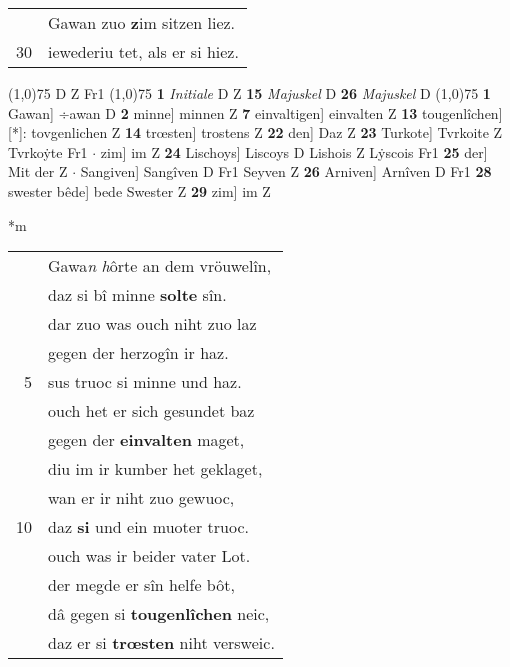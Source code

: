 \documentclass[8pt,a4paper,notitlepage]{article}
\begin{document}
\begin{table}[ht]
\begin{minipage}[t]{0.5\linewidth}
\begin{tabular}{rl}
 & Gawan zuo \textbf{z}im sitzen liez.\\ 
30 & iewederiu tet, als er si hiez.\\ 
\end{tabular}
\scriptsize
\line(1,0){75} \newline
D Z Fr1 \newline
\line(1,0){75} \newline
\textbf{1} \textit{Initiale} D Z  \textbf{15} \textit{Majuskel} D  \textbf{26} \textit{Majuskel} D  \newline
\line(1,0){75} \newline
\textbf{1} Gawan] ÷awan D \textbf{2} minne] minnen Z \textbf{7} einvaltigen] einvalten Z \textbf{13} tougenlîchen] [*]: tovgenlichen Z \textbf{14} trœsten] trostens Z \textbf{22} den] Daz Z \textbf{23} Turkote] Tvrkoite Z Tvrkoẏte Fr1  $\cdot$ zim] im Z \textbf{24} Lischoys] Liscoys D Lishois Z Lẏscois Fr1 \textbf{25} der] Mit der Z  $\cdot$ Sangiven] Sangîven D Fr1 Seyven Z \textbf{26} Arniven] Arnîven D Fr1 \textbf{28} swester bêde] bede Swester Z \textbf{29} zim] im Z \newline
\end{minipage}
\hspace{0.5cm}
\begin{minipage}[t]{0.5\linewidth}
\small
\begin{center}*m
\end{center}
\begin{tabular}{rl}
 & Gawa\textit{n} \textit{h}ôrte an dem vröuwelîn,\\ 
 & daz si bî minne \textbf{solte} sîn.\\ 
 & dar zuo was ouch niht zuo laz\\ 
 & gegen der herzogîn ir haz.\\ 
5 & sus truoc si minne und haz.\\ 
 & ouch het er sich gesundet baz\\ 
 & gegen der \textbf{einvalten} maget,\\ 
 & diu im ir kumber het geklaget,\\ 
 & wan er ir niht zuo gewuoc,\\ 
10 & daz \textbf{si} und  ein muoter truoc.\\ 
 & ouch was ir beider vater Lot.\\ 
 & der megde er sîn helfe bôt,\\ 
 & dâ gegen si \textbf{tougenlîchen} neic,\\ 
 & daz er si \textbf{trœsten} niht versweic.\\ 

\end{tabular}
\end{minipage}
\end{table}
\end{document}
